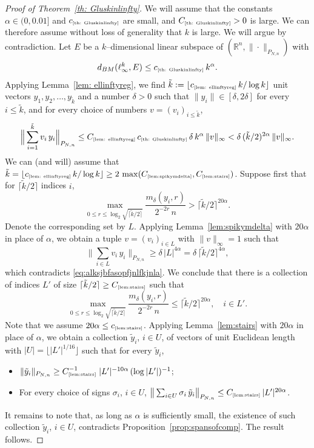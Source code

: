 \documentclass[11pt]{amsart}
\theoremstyle{definition}
\theoremstyle{plain}
\newcommand{\R}{\mathbb{R}}
\def\R{{\mathbb R}}
\begin{document}
\begin{proof}[Proof of Theorem~\ref{th: Gluskinlinfty}]
We will assume that the constants $\alpha\in(0,0.01]$
and $c_{\text{\tiny\ref{th: Gluskinlinfty}}}$
are small, and $C_{\text{\tiny\ref{th: Gluskinlinfty}}}>0$ is large.
We can therefore assume without loss of generality that $k$ is large.
We will argue by contradiction.
Let $E$ be a $k$--dimensional linear subspace of $(\R^n,\|\cdot\|_{P_{N,n}})$
with 
$$
d_{BM}(\ell_\infty^k,E)
\leq c_{\text{\tiny\ref{th: Gluskinlinfty}}}\,k^\alpha.
$$
Applying Lemma~\ref{lem: ellinftyreg},
we find $\tilde k:=\lfloor c_{\text{\tiny\ref{lem: ellinftyreg}}}\,k/\log k\rfloor$
unit vectors $y_1,y_2,\dots,y_{\tilde k}$
and a number $\delta>0$ such that
$\|y_i\|\in[\delta,2\delta]$ for every $i\leq \tilde k$,
and for every choice of numbers $v=(v_i)_{i\leq \tilde k}$,
    \begin{equation}\label{eq:alksjbfasopfjnlfkjnla}
    \Big\|
    \sum_{i=1}^{\tilde k}v_i\,y_i
    \Big\|_{P_{N,n}}\leq C_{\text{\tiny\ref{lem: ellinftyreg}}}\,c_{\text{\tiny\ref{th: Gluskinlinfty}}}\,\delta\,k^\alpha\,\|v\|_\infty
    <\delta\,(\tilde k/2)^{2\alpha}\,\|v\|_\infty.
    \end{equation}
We can (and will) assume that
$\tilde k=
\lfloor c_{\text{\tiny\ref{lem: ellinftyreg}}}\,k/\log k\rfloor\geq
2\,\max(C_{\text{\tiny\ref{lem:spikymdelta}}},
C_{\text{\tiny\ref{lem:stairs}}})$.
Suppose first that for $\lceil \tilde k/2\rceil $ indices $i$,
$$
\max\limits_{0\leq r\leq \log_2 \sqrt{\lceil \tilde k/2\rceil}}
\frac{m_\delta(y_i,r)}{2^{-2r}\,n}
>
\lceil \tilde k/2\rceil^{20\alpha}.
$$
Denote the corresponding set by $L$.
Applying Lemma~\ref{lem:spikymdelta}
with $20\alpha$ in place of $\alpha$,
we obtain a tuple $v=(v_i)_{i\in L}$ with $\|v\|_\infty=1$
such that
$$
\Big\|\sum_{i\in L}v_i\,y_i\Big\|_{P_{N,n}}
\geq \delta\,|L|^{4\alpha}=\delta\,\lceil\tilde k/2\rceil^{4\alpha},
$$
which contradicts \eqref{eq:alksjbfasopfjnlfkjnla}.
We conclude that there is a collection of indices $L'$
of size $\lceil \tilde k/2\rceil\geq C_{\text{\tiny\ref{lem:stairs}}}$
such that
$$
\max\limits_{0\leq r\leq \log_2 \sqrt{\lceil \tilde k/2\rceil}}
\frac{m_\delta(y_i,r)}{2^{-2r}\,n}
\leq
\lceil \tilde k/2\rceil^{20\alpha},\quad i\in L'.
$$
Note that we assume $20\alpha\leq c_{\text{\tiny\ref{lem:stairs}}}$.
Applying Lemma~\ref{lem:stairs} with $20\alpha$
in place of $\alpha$,
we obtain a collection
$\tilde y_i$, $i\in U$,
of vectors of unit Euclidean length
with $|U|=\big\lfloor |L'|^{1/16}\big\rfloor$ such that for every $\tilde y_i$,
\begin{itemize}
    \item $\|\tilde y_i\|_{P_{N,n}}\geq
    C_{\text{\tiny\ref{lem:stairs}}}^{-1}\;|L'|^{-10\alpha}\,
    (\log |L'|)^{-1}$;
    \item For every choice of signs $\sigma_i$, $i\in U$, $\big\|
    \sum_{i\in U}\sigma_i\,\tilde y_i
    \big\|_{P_{N,n}}\leq C_{\text{\tiny\ref{lem:stairs}}}\,|L'|^{20\alpha}$.
\end{itemize}
It remains to note that, as long as $\alpha$
is sufficiently small, the existence of such collection
$\tilde y_i$, $i\in U$, contradicts
Proposition~\ref{prop:spansofcomp}.
The result follows.
\end{proof}
\end{document}
